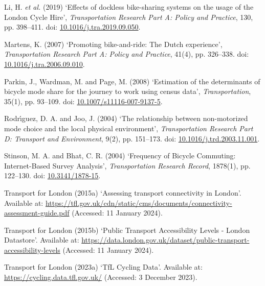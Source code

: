 \documentclass[
  a4paper,
  DIV=11,
  numbers=noendperiod]{scrartcl}
\newlength{\cslhangindent}
\newlength{\cslentryspacingunit} %
\newenvironment{CSLReferences}[2] %
 {%
  \setlength{\parindent}{0pt}
  \ifodd #1
  \let\oldpar\par
  \def\par{\hangindent=\cslhangindent\oldpar}
  \fi
  \setlength{\parskip}{#2\cslentryspacingunit}
 }%
 {}
\begin{document}
\begin{CSLReferences}{0}{0}
\leavevmode{}%
Li, H. \emph{et al.} (2019) {`Effects of dockless bike-sharing systems
on the usage of the {London} {Cycle} {Hire}'}, \emph{Transportation
Research Part A: Policy and Practice}, 130, pp. 398--411. doi:
\href{https://doi.org/10.1016/j.tra.2019.09.050}{10.1016/j.tra.2019.09.050}.

\leavevmode{}%
Martens, K. (2007) {`Promoting bike-and-ride: {The} {Dutch}
experience'}, \emph{Transportation Research Part A: Policy and
Practice}, 41(4), pp. 326--338. doi:
\href{https://doi.org/10.1016/j.tra.2006.09.010}{10.1016/j.tra.2006.09.010}.

\leavevmode{}%
Parkin, J., Wardman, M. and Page, M. (2008) {`Estimation of the
determinants of bicycle mode share for the journey to work using census
data'}, \emph{Transportation}, 35(1), pp. 93--109. doi:
\href{https://doi.org/10.1007/s11116-007-9137-5}{10.1007/s11116-007-9137-5}.

\leavevmode{}%
Rodrı́guez, D. A. and Joo, J. (2004) {`The relationship between
non-motorized mode choice and the local physical environment'},
\emph{Transportation Research Part D: Transport and Environment}, 9(2),
pp. 151--173. doi:
\href{https://doi.org/10.1016/j.trd.2003.11.001}{10.1016/j.trd.2003.11.001}.

\leavevmode{}%
Stinson, M. A. and Bhat, C. R. (2004) {`Frequency of {Bicycle}
{Commuting}: {Internet}-{Based} {Survey} {Analysis}'},
\emph{Transportation Research Record}, 1878(1), pp. 122--130. doi:
\href{https://doi.org/10.3141/1878-15}{10.3141/1878-15}.

\leavevmode{}%
Transport for London (2015a) {`Assessing transport connectivity in
{London}'}. Available at:
\url{https://tfl.gov.uk/cdn/static/cms/documents/connectivity-assessment-guide.pdf}
(Accessed: 11 January 2024).

\leavevmode{}%
Transport for London (2015b) {`Public {Transport} {Accessibility}
{Levels} - {London} {Datastore}'}. Available at:
\url{https://data.london.gov.uk/dataset/public-transport-accessibility-levels}
(Accessed: 11 January 2024).

\leavevmode{}%
Transport for London (2023a) {`{TfL} {Cycling} {Data}'}. Available at:
\url{https://cycling.data.tfl.gov.uk/} (Accessed: 3 December 2023).


\end{CSLReferences}
\end{document}
